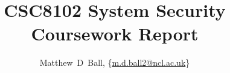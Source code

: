 \documentclass[10pt,journal,compsoc]{IEEEtran}
\begin{document}
%
\title{CSC8102 System Security Coursework Report}
%
%
%
%

\author{Matthew~D~Ball, \{\url{m.d.ball2@ncl.ac.uk}\}}%

% 
%
\end{document}
